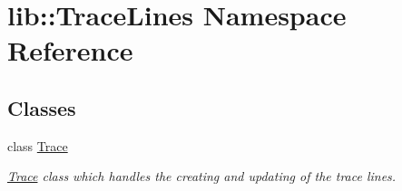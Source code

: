 \hypertarget{namespacelib_1_1TraceLines}{\section{lib\-:\-:\-Trace\-Lines \-Namespace \-Reference}
\label{namespacelib_1_1TraceLines}
}
\subsection*{\-Classes}
\begin{DoxyCompactItemize}
\item 
class \hyperlink{classlib_1_1TraceLines_1_1Trace}{\-Trace}
\begin{DoxyCompactList}\small\item\em \hyperlink{classlib_1_1TraceLines_1_1Trace}{\-Trace} class which handles the creating and updating of the trace lines. \end{DoxyCompactList}\end{DoxyCompactItemize}
